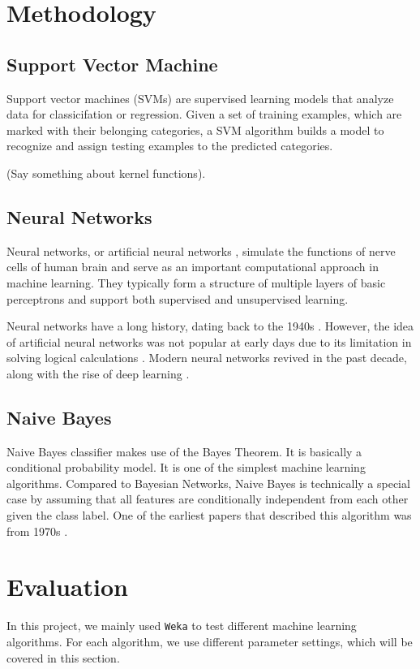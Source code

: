 \documentclass[11pt]{article}
\begin{document}
\section{Methodology}\label{sec:metho}

\subsection{Support Vector Machine}
Support vector machines (SVMs) \cite{cortes1995support} are supervised learning models that analyze data for classicifation or regression. Given a set of training examples, which are marked with their belonging categories, a SVM algorithm builds a model to recognize and assign testing examples to the predicted categories. 

(Say something about kernel functions).

\subsection{Neural Networks}
Neural networks, or artificial neural networks \cite{hagan1996neural}, simulate the functions of nerve cells of human brain and serve as an important computational approach in machine learning. They typically form a structure of multiple layers of basic perceptrons and support both supervised and unsupervised learning.

Neural networks have a long history, dating back to the 1940s \cite{mcculloch1943logical}. However, the idea of artificial neural networks was not popular at early days due to its limitation in solving logical calculations \cite{minsky1988perceptrons}. Modern neural networks revived in the past decade, along with the rise of deep learning \cite{bengio2009learning, schmidhuber2015deep}.

\subsection{Naive Bayes}
Naive Bayes classifier makes use of the Bayes Theorem. It is basically a conditional probability model. It is one of the simplest machine learning algorithms. Compared to Bayesian Networks, Naive Bayes is technically a special case by assuming that all features are conditionally independent from each other given the class label. One of the earliest papers that described this algorithm was from 1970s \cite{duda1973pattern}. 

\section{Evaluation}
In this project, we mainly used \texttt{Weka} \cite{hall2009weka} to test different machine learning algorithms. For each algorithm, we use different parameter settings, which will be covered in this section.
\end{document}
